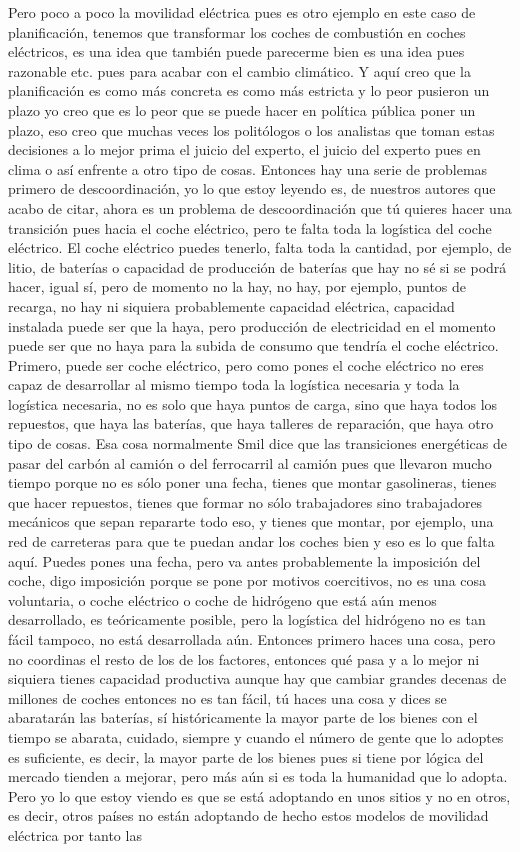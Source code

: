 Pero poco a poco la movilidad eléctrica pues es otro ejemplo en este caso de planificación, tenemos que transformar los coches de combustión en coches eléctricos, es una idea que también puede parecerme bien es una idea pues razonable etc. pues para acabar con el cambio climático. Y aquí creo que la planificación es como más concreta es como más estricta y lo peor pusieron un plazo yo creo que es lo peor que se puede hacer en política pública poner un plazo, eso creo que muchas veces los politólogos o los analistas que toman estas decisiones a lo mejor prima el juicio del experto, el juicio del experto pues en clima o así enfrente a otro tipo de cosas. Entonces hay una serie de problemas primero de descoordinación, yo lo que estoy leyendo es, de nuestros autores que acabo de citar, ahora es un problema de descoordinación que tú quieres hacer una transición pues hacia el coche eléctrico, pero te falta toda la logística del coche eléctrico. El coche eléctrico puedes tenerlo, falta toda la cantidad, por ejemplo, de litio, de baterías o capacidad de producción de baterías que hay no sé si se podrá hacer, igual sí, pero de momento no la hay, no hay, por ejemplo, puntos de recarga, no hay ni siquiera probablemente capacidad eléctrica, capacidad instalada puede ser que la haya, pero producción de electricidad en el momento puede ser que no haya para la subida de consumo que tendría el coche eléctrico. Primero, puede ser coche eléctrico, pero como pones el coche eléctrico no eres capaz de desarrollar al mismo tiempo toda la logística necesaria y toda la logística necesaria, no es solo que haya puntos de carga, sino que haya todos los repuestos, que haya las baterías, que haya talleres de reparación, que haya otro tipo de cosas. Esa cosa normalmente Smil dice que las transiciones energéticas de pasar del carbón al camión o del ferrocarril al camión pues que llevaron mucho tiempo porque no es sólo poner una fecha, tienes que montar gasolineras, tienes que hacer repuestos, tienes que formar no sólo trabajadores sino trabajadores mecánicos que sepan repararte todo eso, y tienes que montar, por ejemplo, una red de carreteras para que te puedan andar los coches bien y eso es lo que falta aquí. Puedes pones una fecha, pero va antes probablemente la imposición del coche, digo imposición porque se pone por motivos coercitivos, no es una cosa voluntaria, o coche eléctrico o coche de hidrógeno que está aún menos desarrollado, es teóricamente posible, pero la logística del hidrógeno no es tan fácil tampoco, no está desarrollada aún. Entonces primero haces una cosa, pero no coordinas el resto de los de los factores, entonces qué pasa y a lo mejor ni siquiera tienes capacidad productiva aunque hay que cambiar grandes decenas de millones de coches entonces no es tan fácil, tú haces una cosa y dices se abaratarán las baterías, sí históricamente la mayor parte de los bienes con el tiempo se abarata, cuidado, siempre y cuando el número de gente que lo adoptes es suficiente, es decir, la mayor parte de los bienes pues si tiene por lógica del mercado tienden a mejorar, pero más aún si es toda la humanidad que lo adopta. Pero yo lo que estoy viendo es que se está adoptando en unos sitios y no en otros, es decir, otros países no están adoptando de hecho estos modelos de movilidad eléctrica por tanto las 